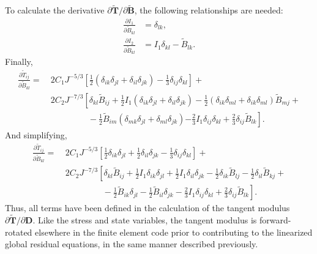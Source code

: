 To calculate the derivative $\partial \tilde{\bm T}/\partial {\tilde{\bm {B}}}$, the following relationships are needed:
\begin{align}
\frac{\partial I_1}{\partial \tilde{B}_{kl}} &= \delta_{lk},  \\
\frac{\partial I_2}{\partial \tilde{B}_{kl}} &= I_1\delta_{kl} - \tilde{B}_{lk}.
\end{align}
Finally,
\begin{equation}
\begin{aligned}
\frac{\partial \tilde{T}_{ij}}{\partial \tilde{B}_{kl}} = &\ 2C_1J^{-5/3}\left[\frac{1}{2}\left(\delta_{ik}\delta_{jl} + \delta_{il}\delta_{jk}\right) - \frac{1}{3}\delta_{ij}\delta_{kl}\right] + \\
&\ 2C_2J^{-7/3}\left[\delta_{kl}\tilde{B}_{ij} + \frac{1}{2}I_1\left(\delta_{ik}\delta_{jl} + \delta_{il}\delta_{jk}\right) -\frac{1}{2}\left(\delta_{ik}\delta_{ml} + \delta_{ik}\delta_{ml}\right)\tilde{B}_{mj} \right. + \\
&\phantom{xxxxxxxx}-\frac{1}{2}\tilde{B}_{im}\left(\delta_{mk}\delta_{jl} +\delta_{ml}\delta_{jk}\right) 
\left.- \frac{2}{3}I_1\delta_{ij}\delta_{kl} + \frac{2}{3}\delta_{ij}\tilde{B}_{lk}\right].
\end{aligned}
\end{equation}
And simplifying,
\begin{equation}
\begin{aligned}
\frac{\partial \tilde{T}_{ij}}{\partial \tilde{B}_{kl}} = &\ 2C_1J^{-5/3}\left[\frac{1}{2}\delta_{ik}\delta_{jl} + \frac{1}{2}\delta_{il}\delta_{jk} - \frac{1}{3}\delta_{ij}\delta_{kl}\right] + \\
&\ 2C_2J^{-7/3}\left[\delta_{kl}\tilde{B}_{ij} + \frac{1}{2}I_1\delta_{ik}\delta_{jl} + \frac{1}{2}I_1\delta_{il}\delta_{jk} -\frac{1}{2}\delta_{ik}\tilde{B}_{lj} -\frac{1}{2}\delta_{il}\tilde{B}_{kj} \right. + \\
&\left.\phantom{xxxxxxxx}-\frac{1}{2}\tilde{B}_{ik}\delta_{jl} -\frac{1}{2}\tilde{B}_{il}\delta_{jk} - \frac{2}{3}I_1\delta_{ij}\delta_{kl} + \frac{2}{3}\delta_{ij}\tilde{B}_{lk}\right].
\end{aligned}
\end{equation}
Thus, all terms have been defined in the calculation of the tangent modulus $\partial{\tilde{\bm{T}}}/\partial{\bm{D}}$. Like the stress and state variables, the tangent modulus is forward-rotated elsewhere in the finite element code prior to contributing to the linearized global residual equations, in the same manner described previously.

